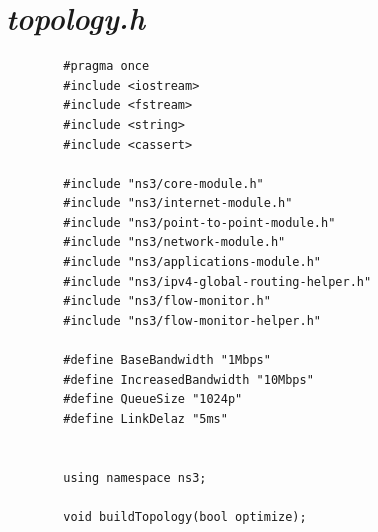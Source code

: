 \documentclass[a4paper, 12pt, projekat]{etf}
\begin{document}
	\section*{\emph{topology.h}}
	\begin{verbatim}
		#pragma once
		#include <iostream>
		#include <fstream>
		#include <string>
		#include <cassert>
		
		#include "ns3/core-module.h"
		#include "ns3/internet-module.h"
		#include "ns3/point-to-point-module.h"
		#include "ns3/network-module.h"
		#include "ns3/applications-module.h"
		#include "ns3/ipv4-global-routing-helper.h"
		#include "ns3/flow-monitor.h"
		#include "ns3/flow-monitor-helper.h"
		
		#define BaseBandwidth "1Mbps"
		#define IncreasedBandwidth "10Mbps"
		#define QueueSize "1024p"
		#define LinkDelaz "5ms"
		
		
		using namespace ns3;
		
		void buildTopology(bool optimize);
	\end{verbatim}
\end{document}
